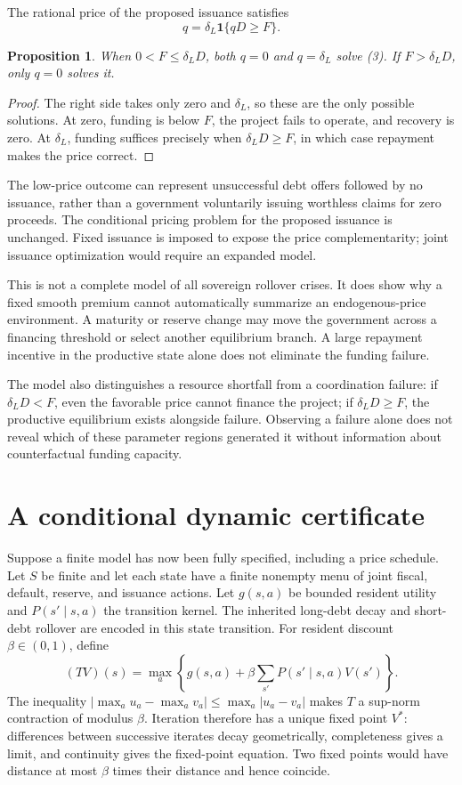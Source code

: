 \documentclass[11pt,a4paper]{article}
\newtheorem{proposition}[theorem]{Proposition}
\newcommand{\ind}{\mathbf 1}
\begin{document}
The rational price of the proposed issuance satisfies
\[
 q=\delta_L\ind\{qD\ge F\}.
 \tag{3}
\]
\begin{proposition}
When $0<F\le\delta_LD$, both $q=0$ and $q=\delta_L$ solve (3). If $F>\delta_LD$, only $q=0$ solves it.
\end{proposition}
\begin{proof}
The right side takes only zero and $\delta_L$, so these are the only possible solutions. At zero, funding is below $F$, the project fails to operate, and recovery is zero. At $\delta_L$, funding suffices precisely when $\delta_LD\ge F$, in which case repayment makes the price correct.
\end{proof}
The low-price outcome can represent unsuccessful debt offers followed by no issuance, rather than a government voluntarily issuing worthless claims for zero proceeds. The conditional pricing problem for the proposed issuance is unchanged. Fixed issuance is imposed to expose the price complementarity; joint issuance optimization would require an expanded model.

This is not a complete model of all sovereign rollover crises. It does show why a fixed smooth premium cannot automatically summarize an endogenous-price environment. A maturity or reserve change may move the government across a financing threshold or select another equilibrium branch. A large repayment incentive in the productive state alone does not eliminate the funding failure.

The model also distinguishes a resource shortfall from a coordination failure: if $\delta_LD<F$, even the favorable price cannot finance the project; if $\delta_LD\ge F$, the productive equilibrium exists alongside failure. Observing a failure alone does not reveal which of these parameter regions generated it without information about counterfactual funding capacity.
\section{A conditional dynamic certificate}
Suppose a finite model has now been fully specified, including a price schedule. Let $S$ be finite and let each state have a finite nonempty menu of joint fiscal, default, reserve, and issuance actions. Let $g(s,a)$ be bounded resident utility and $P(s'\mid s,a)$ the transition kernel. The inherited long-debt decay and short-debt rollover are encoded in this state transition. For resident discount $\beta\in(0,1)$, define
\[
 (TV)(s)=\max_a\left\{g(s,a)+\beta\sum_{s'}P(s'\mid s,a)V(s')\right\}.
\]
The inequality $|\max_a u_a-\max_a v_a|\le\max_a|u_a-v_a|$ makes $T$ a sup-norm contraction of modulus $\beta$. Iteration therefore has a unique fixed point $V^*$: differences between successive iterates decay geometrically, completeness gives a limit, and continuity gives the fixed-point equation. Two fixed points would have distance at most $\beta$ times their distance and hence coincide.
\end{document}
